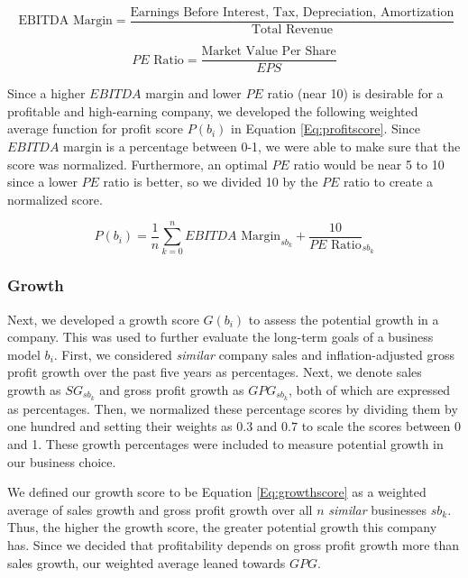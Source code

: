 \documentclass{mcmthesis}
\begin{document}
\begin{equation}
     \text{ EBITDA Margin} = \frac{\text{Earnings Before Interest, Tax, Depreciation, Amortization}}{\text{Total Revenue}}
    \label{Eq:EBITDA}
\end{equation}

\begin{equation}
    PE \text{ Ratio} = \frac{\text{Market Value Per Share}}{EPS}
    \label{Eq:PERatio}
\end{equation}

Since a higher $EBITDA$ margin and lower $PE$ ratio (near 10) is desirable for a profitable and high-earning company, we developed the following weighted average function for profit score $P(b_i)$ in Equation \ref{Eq:profitscore}. Since $EBITDA$ margin is a percentage between 0-1, we were able to make sure that the score was normalized. Furthermore, an optimal $PE$ ratio would be near 5 to 10 since a lower $PE$ ratio is better, so we divided 10 by the $PE$ ratio to create a normalized score. 

\begin{equation}
    P(b_i) = \frac{1}{n} \sum_{k=0}^n  EBITDA \text{ Margin}_{sb_k} + \frac{10}{PE \text{ Ratio}}_{sb_k}
    \label{Eq:profitscore}
\end{equation}

\subsubsection{Growth}
Next, we developed a growth score $G(b_i)$ to assess the potential growth in a company. This was used to further evaluate the long-term goals of a business model $b_i$. First, we considered \textit{similar} company sales and inflation-adjusted gross profit growth over the past five years as percentages. Next, we denote sales growth as $SG_{sb_k}$ and gross profit growth as $GPG_{sb_k}$, both of which are expressed as percentages. Then, we normalized these percentage scores by dividing them by one hundred and setting their weights as $0.3$ and $0.7$ to scale the scores between 0 and 1. These growth percentages were included to measure potential growth in our business choice. 

We defined our growth score to be Equation \ref{Eq:growthscore} as a weighted average of sales growth and gross profit growth over all $n$ \textit{similar} businesses $sb_k$. Thus, the higher the growth score, the greater potential growth this company has. Since we decided that profitability depends on gross profit growth more than sales growth, our weighted average leaned towards $GPG$. 
\end{document}
